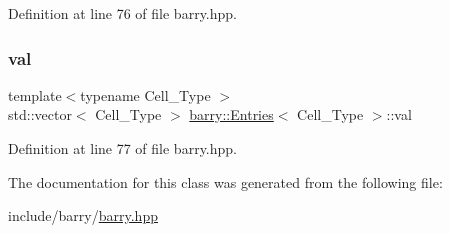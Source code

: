 Definition at line 76 of file barry.\+hpp.

\mbox{\label{classbarry_1_1_entries_af2570fcd2f42e9a1704f9c254507284c}} 
\subsubsection{\texorpdfstring{val}{val}}
{\footnotesize\ttfamily template$<$typename Cell\+\_\+\+Type $>$ \\
std\+::vector$<$ Cell\+\_\+\+Type $>$ \hyperlink{classbarry_1_1_entries}{barry\+::\+Entries}$<$ Cell\+\_\+\+Type $>$\+::val}



Definition at line 77 of file barry.\+hpp.



The documentation for this class was generated from the following file\+:\begin{DoxyCompactItemize}
\item 
include/barry/\hyperlink{barry_8hpp}{barry.\+hpp}\end{DoxyCompactItemize}
